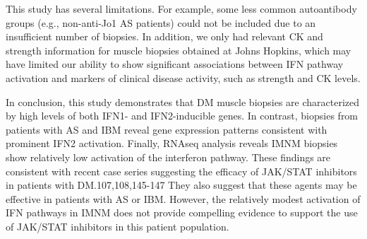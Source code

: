 This study has several limitations. For example, some less common autoantibody groups (e.g., non-anti-Jo1 AS patients) could not be included due to an insufficient number of biopsies. In addition, we only had relevant CK and strength information for muscle biopsies obtained at Johns Hopkins, which may have limited our ability to show significant associations between IFN pathway activation and markers of clinical disease activity, such as strength and CK levels.

In conclusion, this study demonstrates that DM muscle biopsies are characterized by high levels of both IFN1- and IFN2-inducible genes. In contrast, biopsies from patients with AS and IBM reveal gene expression patterns consistent with prominent IFN2 activation. Finally, RNAseq analysis reveals IMNM biopsies show relatively low activation of the interferon pathway. These findings are consistent with recent case series suggesting the efficacy of JAK/STAT inhibitors in patients with DM.107,108,145-147 They also suggest that these agents may be effective in patients with AS or IBM. However, the relatively modest activation of IFN pathways in IMNM does not provide compelling evidence to support the use of JAK/STAT inhibitors in this patient population.

